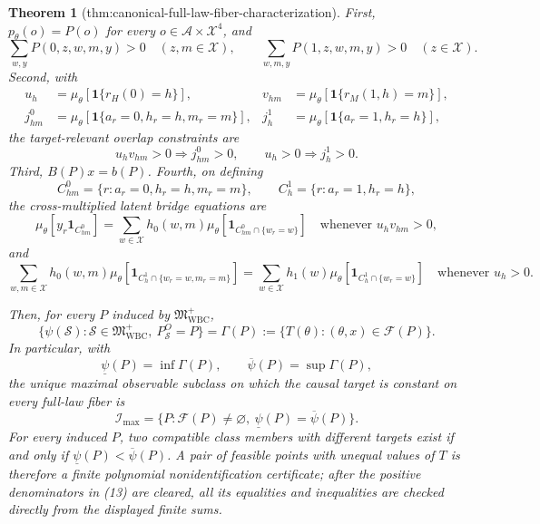\documentclass{article}
\newtheorem{theorem}{Theorem}
\begin{document}
\begin{theorem}[thm:canonical-full-law-fiber-characterization]
First, \(p_\theta(o)=P(o)\) for every
\(o\in\mathcal A\times\mathcal X^4\), and
\[
 \sum_{w,y}P(0,z,w,m,y)>0\quad(z,m\in\mathcal X),
 \qquad
 \sum_{w,m,y}P(1,z,w,m,y)>0\quad(z\in\mathcal X).
 \tag{13}
\]
Second, with
\[
\begin{aligned}
 u_h&=\mu_\theta[\mathbf 1\{r_H(0)=h\}],&
 v_{hm}&=\mu_\theta[\mathbf 1\{r_M(1,h)=m\}],\\
 j^0_{hm}&=\mu_\theta[\mathbf 1\{a_r=0,h_r=h,m_r=m\}],&
 j^1_h&=\mu_\theta[\mathbf 1\{a_r=1,h_r=h\}],
\end{aligned}
\]
the target-relevant overlap constraints are
\[
 u_hv_{hm}>0\Longrightarrow j^0_{hm}>0,
 \qquad
 u_h>0\Longrightarrow j^1_h>0.
 \tag{14}
\]
Third, \(B(P)x=b(P)\).  Fourth, on defining
\[
 C^0_{hm}=\{r:a_r=0,h_r=h,m_r=m\},
 \qquad C^1_h=\{r:a_r=1,h_r=h\},
\]
the cross-multiplied latent bridge equations are
\[
 \mu_\theta[y_r\mathbf 1_{C^0_{hm}}]
 =\sum_{w\in\mathcal X}h_0(w,m)
   \mu_\theta[\mathbf 1_{C^0_{hm}\cap\{w_r=w\}}]
 \quad\text{whenever }u_hv_{hm}>0,
 \tag{15}
\]
and
\[
 \sum_{w,m\in\mathcal X}h_0(w,m)
   \mu_\theta[\mathbf 1_{C^1_h\cap\{w_r=w,m_r=m\}}]
 =\sum_{w\in\mathcal X}h_1(w)
   \mu_\theta[\mathbf 1_{C^1_h\cap\{w_r=w\}}]
 \quad\text{whenever }u_h>0.
 \tag{16}
\]

Then, for every \(P\) induced by \(\mathfrak M_{\mathrm{WBC}}^{+}\),
\[
 \{\psi(\mathcal S):\mathcal S\in\mathfrak M_{\mathrm{WBC}}^{+},\ 
 P_{\mathcal S}^O=P\}
 =\Gamma(P):=\{T(\theta):(\theta,x)\in\mathcal F(P)\}.
 \tag{17}
\]
In particular, with
\[
 \underline\psi(P)=\inf\Gamma(P),\qquad
 \overline\psi(P)=\sup\Gamma(P),
 \tag{18}
\]
the unique maximal observable subclass on which the causal target is constant on
every full-law fiber is
\[
 \mathcal I_{\max}=
 \{P:\mathcal F(P)\ne\varnothing,\ 
       \underline\psi(P)=\overline\psi(P)\}.
 \tag{19}
\]
For every induced \(P\), two compatible class members with different targets
exist if and only if
\(\underline\psi(P)<\overline\psi(P)\).  A pair of feasible points with unequal
values of \(T\) is therefore a finite polynomial nonidentification certificate;
after the positive denominators in (13) are cleared, all its equalities and
inequalities are checked directly from the displayed finite sums.


\end{theorem}
\end{document}

